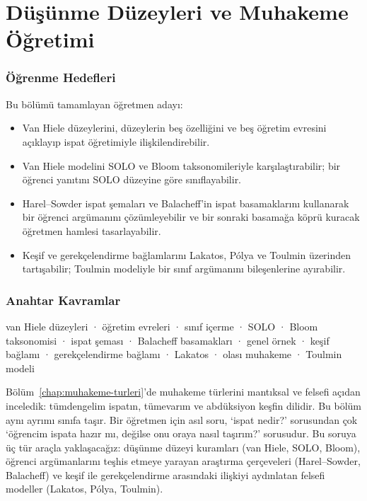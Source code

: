 \chapter{Düşünme Düzeyleri ve Muhakeme Öğretimi}
\label{chap:muhakeme-ogretimi}
\thispagestyle{plain}

\subsection*{Öğrenme Hedefleri}
Bu bölümü tamamlayan öğretmen adayı:
\begin{itemize}[leftmargin=1.4em]
\item Van Hiele düzeylerini, düzeylerin beş özelliğini ve beş öğretim evresini açıklayıp ispat öğretimiyle ilişkilendirebilir.
\item Van Hiele modelini SOLO ve Bloom taksonomileriyle karşılaştırabilir; bir öğrenci yanıtını SOLO düzeyine göre sınıflayabilir.
\item Harel–Sowder ispat şemaları ve Balacheff’in ispat basamaklarını kullanarak bir öğrenci argümanını çözümleyebilir ve bir sonraki basamağa köprü kuracak öğretmen hamlesi tasarlayabilir.
\item Keşif ve gerekçelendirme bağlamlarını Lakatos, Pólya ve Toulmin üzerinden tartışabilir; Toulmin modeliyle bir sınıf argümanını bileşenlerine ayırabilir.
\end{itemize}

\subsection*{Anahtar Kavramlar}
{\small van Hiele düzeyleri · öğretim evreleri · sınıf içerme · SOLO · Bloom taksonomisi · ispat şeması · Balacheff basamakları · genel örnek · keşif bağlamı · gerekçelendirme bağlamı · Lakatos · olası muhakeme · Toulmin modeli}


Bölüm~\ref{chap:muhakeme-turleri}’de muhakeme türlerini mantıksal ve felsefi açıdan inceledik: tümdengelim ispatın, tümevarım ve abdüksiyon keşfin dilidir. Bu bölüm aynı ayrımı sınıfa taşır. Bir öğretmen için asıl soru, ‘ispat nedir?’ sorusundan çok ‘öğrencim ispata hazır mı, değilse onu oraya nasıl taşırım?’ sorusudur. Bu soruya üç tür araçla yaklaşacağız: düşünme düzeyi kuramları (van Hiele, SOLO, Bloom), öğrenci argümanlarını teşhis etmeye yarayan araştırma çerçeveleri (Harel–Sowder, Balacheff) ve keşif ile gerekçelendirme arasındaki ilişkiyi aydınlatan felsefi modeller (Lakatos, Pólya, Toulmin).

